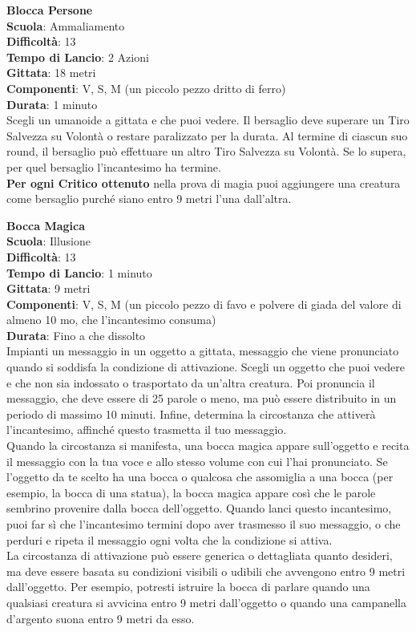 \begin{multicols}{2}
\medskip\textbf{Blocca Persone}\\
\textbf{Scuola}: Ammaliamento\\
\textbf{Difficoltà}:  13\\
\textbf{Tempo di Lancio}: 2 Azioni\\
\textbf{Gittata}: 18 metri\\
\textbf{Componenti}: V, S, M (un piccolo pezzo dritto di ferro)\\
\textbf{Durata}: 1 minuto\\
Scegli un umanoide a gittata e che puoi vedere. Il bersaglio deve superare un Tiro Salvezza su Volontà o restare paralizzato per la durata. Al termine di ciascun suo round, il bersaglio può effettuare un altro Tiro Salvezza su Volontà. Se lo supera, per quel bersaglio l'incantesimo ha termine.\\
\textbf{Per ogni Critico ottenuto} nella prova di magia puoi aggiungere una creatura come bersaglio purché siano entro 9 metri l’una dall'altra.

\medskip\textbf{Bocca Magica}\\
\textbf{Scuola}: Illusione\\
\textbf{Difficoltà}:  13\\
\textbf{Tempo di Lancio}: 1 minuto\\
\textbf{Gittata}: 9 metri\\
\textbf{Componenti}: V, S, M (un piccolo pezzo di favo e polvere di giada del valore di almeno 10 mo, che l'incantesimo consuma)\\
\textbf{Durata}: Fino a che dissolto\\
Impianti un messaggio in un oggetto a gittata, messaggio che viene pronunciato quando si soddisfa la condizione di attivazione. Scegli un oggetto che puoi vedere e che non sia indossato o trasportato da un'altra creatura. Poi pronuncia il messaggio, che deve essere di 25 parole o meno, ma può essere distribuito in un periodo di massimo 10 minuti. Infine, determina la circostanza che attiverà l'incantesimo, affinché questo trasmetta il tuo messaggio.\\
Quando la circostanza si manifesta, una bocca magica appare sull'oggetto e recita il messaggio con la tua voce e allo stesso volume con cui l’hai pronunciato. Se l’oggetto da te scelto ha una bocca o qualcosa che assomiglia a una bocca (per esempio, la bocca di una statua), la bocca magica appare così che le parole sembrino provenire dalla bocca dell'oggetto. Quando lanci questo incantesimo, puoi far sì che l'incantesimo termini dopo aver trasmesso il suo messaggio, o che perduri e ripeta il messaggio ogni volta che la condizione si attiva.\\
La circostanza di attivazione può essere generica o dettagliata quanto desideri, ma deve essere basata su condizioni visibili o udibili che avvengono entro 9 metri dall'oggetto. Per esempio, potresti istruire la bocca di parlare quando una qualsiasi creatura si avvicina entro  9 metri dall'oggetto o quando una campanella d’argento suona entro 9 metri da esso.


\end{multicols}
